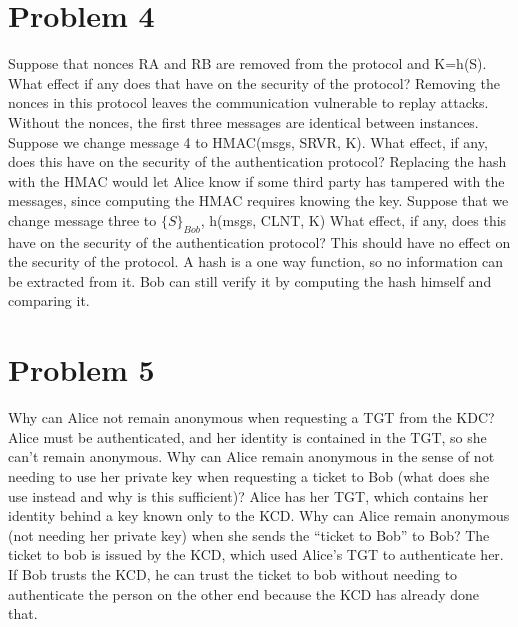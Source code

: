 \documentclass{article}
\newenvironment{problem}[1]{
  \nobreak\section*{Problem #1}
}{}
\begin{document}
  \begin{problem}{4}
    Suppose that nonces RA and RB are removed from the protocol and 
    K=h(S).  What effect if any does that have on the security of the
    protocol?
    \bigbreak
    Removing the nonces in this protocol leaves the communication
    vulnerable to replay attacks.  Without the nonces, the first
    three messages are identical between instances.
    \bigbreak\noindent
    Suppose we change message 4 to HMAC(msgs, SRVR, K).  What effect, 
    if any, does this have on the security of the authentication 
    protocol?
    \bigbreak
    Replacing the hash with the HMAC would let Alice know if some third
    party has tampered with the messages, since computing the HMAC
    requires knowing the key.
    \bigbreak\noindent
    Suppose that we change message three to $\{S\}_{Bob}$, h(msgs, CLNT, 
    K)  What effect, if any, does this have on the security of the 
    authentication protocol?
    \bigbreak
    This should have no effect on the security of the protocol.  A
    hash is a one way function, so no information can be extracted
    from it.  Bob can still verify it by computing the hash himself
    and comparing it.
  \end{problem}

  \begin{problem}{5}
    Why can Alice not remain anonymous when requesting a TGT from the
    KDC?
    \bigbreak
    Alice must be authenticated, and her identity is contained in the
    TGT, so she can't remain anonymous.
    \bigbreak\noindent
    Why can Alice remain anonymous in the sense of not needing to use 
    her private key when requesting a ticket to Bob (what does she 
    use instead and why is this sufficient)?
    \bigbreak
    Alice has her TGT, which contains her identity behind a key known
    only to the KCD.
    \bigbreak\noindent
    Why can Alice remain anonymous (not needing her private key) when 
    she sends the ``ticket to Bob'' to Bob?
    \bigbreak
    The ticket to bob is issued by the KCD, which used Alice's TGT to
    authenticate her.  If Bob trusts the KCD, he can trust the ticket
    to bob without needing to authenticate the person on the other
    end because the KCD has already done that.

  \end{problem}
\end{document}
